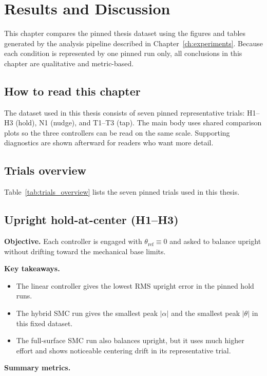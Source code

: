 \chapter{Results and Discussion}
\label{ch:results}

This chapter compares the pinned thesis dataset using the figures and tables generated by the analysis pipeline described in Chapter~\ref{ch:experiments}. Because each condition is represented by one pinned run only, all conclusions in this chapter are qualitative and metric-based.

\section{How to read this chapter}
The dataset used in this thesis consists of seven pinned representative trials: H1--H3 (hold), N1 (nudge), and T1--T3 (tap). The main body uses shared comparison plots so the three controllers can be read on the same scale. Supporting diagnostics are shown afterward for readers who want more detail.

\section{Trials overview}
\noindent Table~\ref{tab:trials_overview} lists the seven pinned trials used in this thesis.
\clearpage

\section{Upright hold-at-center (H1--H3)}
\noindent\textbf{Objective.} Each controller is engaged with $\theta_{\mathrm{ref}} \equiv 0$ and asked to balance upright without drifting toward the mechanical base limits.

\noindent\textbf{Key takeaways.}
\begin{itemize}
  \item The linear controller gives the lowest RMS upright error in the pinned hold runs.
  \item The hybrid SMC run gives the smallest peak $|\alpha|$ and the smallest peak $|\theta|$ in this fixed dataset.
  \item The full-surface SMC run also balances upright, but it uses much higher effort and shows noticeable centering drift in its representative trial.
\end{itemize}

\noindent\textbf{Summary metrics.}


